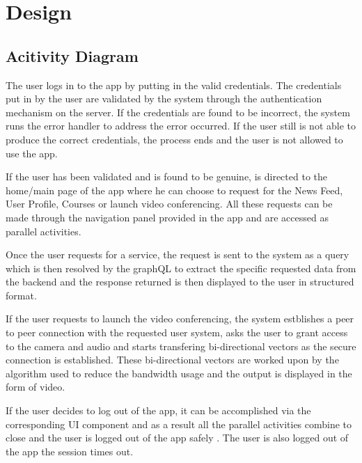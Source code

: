 \chapter{Design}


\section{Acitivity Diagram}

The user logs in to the app by putting in the valid credentials.
The credentials put in by the user are validated by the system through the authentication mechanism on the server.
If the credentials are found to be incorrect, the system runs the error handler to address the error occurred.
If the user still is not able to produce the correct credentials, the process ends and the user is not allowed to use the app.

If the user has been validated and is found to be genuine, is directed to the home/main page of the app where he can choose to request for the News Feed, User Profile, Courses or launch video conferencing.
All these requests can be made through the navigation panel provided in the app and are accessed as parallel activities.

Once the user requests for a service, the request is sent to the system as a query which is then resolved by the graphQL to extract the specific requested data from the backend and the response returned is then displayed to the user in structured format.

If the user requests to launch the video conferencing, the system estblishes a peer to peer connection with the requested user system, asks the user to grant access to the camera and audio and starts transfering bi-directional vectors as the secure connection is established.
These bi-directional vectors are worked upon by the algorithm used to reduce the bandwidth usage and the output is displayed in the form of video.

If the user decides to log out of the app, it can be accomplished via the corresponding UI component and as a result all the parallel activities combine to close and the user is logged out of the app safely .
The user is also logged out of the app the session times out.


